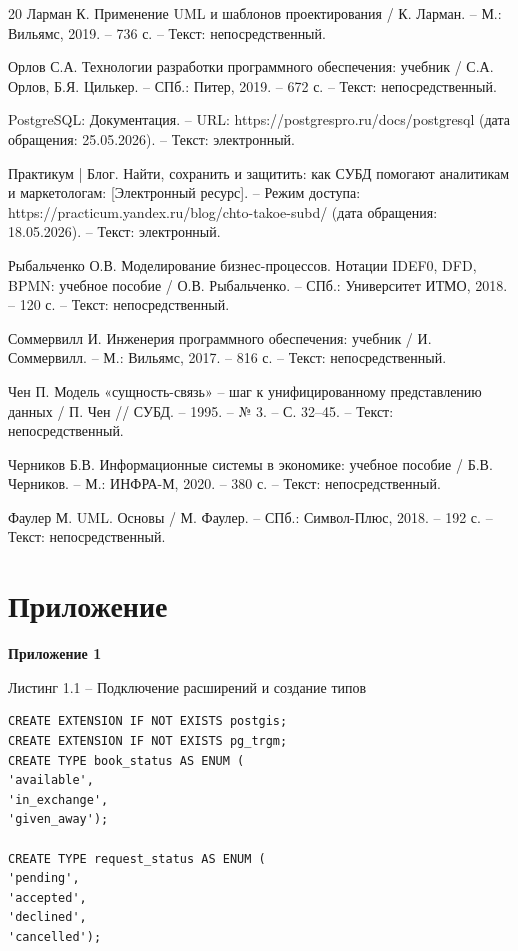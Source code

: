 \documentclass[14pt,a4paper]{extarticle}
\begin{document}
\begin{thebibliography}{20}
  Ларман К. Применение UML и шаблонов проектирования / К. Ларман. -- М.:
  Вильямс, 2019. -- 736 с. -- Текст: непосредственный.

  Орлов С.А. Технологии разработки программного обеспечения: учебник /
  С.А. Орлов, Б.Я. Цилькер. -- СПб.: Питер, 2019. -- 672 с. -- Текст:
  непосредственный.

  PostgreSQL: Документация. -- URL:
  https://postgrespro.ru/docs/postgresql (дата обращения: 25.05.2026).
  -- Текст: электронный.

  Практикум | Блог. Найти, сохранить и защитить: как СУБД
  помогают аналитикам и маркетологам: [Электронный ресурс]. -- Режим
  доступа: https://practicum.yandex.ru/blog/chto-takoe-subd/ (дата
  обращения: 18.05.2026). -- Текст: электронный.

  Рыбальченко О.В. Моделирование бизнес-процессов. Нотации IDEF0, DFD,
  BPMN: учебное пособие / О.В. Рыбальченко. -- СПб.: Университет ИТМО,
  2018. -- 120 с. -- Текст: непосредственный.

  Соммервилл И. Инженерия программного обеспечения: учебник / И.
  Соммервилл. -- М.: Вильямс, 2017. -- 816 с. -- Текст:
  непосредственный.

  Чен П. Модель «сущность-связь» -- шаг к унифицированному представлению
  данных / П. Чен // СУБД. -- 1995. -- № 3. -- С. 32--45. -- Текст:
  непосредственный.

  Черников Б.В. Информационные системы в экономике: учебное пособие /
  Б.В. Черников. -- М.: ИНФРА-М, 2020. -- 380 с. -- Текст:
  непосредственный.

  Фаулер М. UML. Основы / М. Фаулер. -- СПб.: Символ-Плюс, 2018. -- 192
  с. -- Текст: непосредственный.
\end{thebibliography}

\newpage
{}
\section*{Приложение}

\textbf{Приложение 1}

\begin{center}
Листинг 1.1 -- Подключение расширений и создание типов
\end{center}
\begin{lstlisting}
CREATE EXTENSION IF NOT EXISTS postgis;
CREATE EXTENSION IF NOT EXISTS pg_trgm;
CREATE TYPE book_status AS ENUM (
'available',
'in_exchange',
'given_away');

CREATE TYPE request_status AS ENUM (
'pending',
'accepted',
'declined',
'cancelled');
\end{lstlisting}
\end{document}
